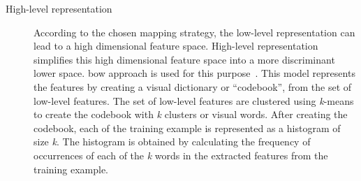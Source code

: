 \begin{description}
\item[High-level representation] According to the chosen mapping strategy, the low-level representation can lead to a high dimensional feature space. 
High-level representation simplifies this high dimensional feature space into a more discriminant lower space. 
\ac{bow} approach is used for this purpose~\cite{Sivic2003}.
This model represents the features by creating a visual dictionary or ``codebook'', from the set of low-level features.
The set of low-level features are clustered using \textit{k}-means to create the codebook with \textit{k} clusters or visual words.
After creating the codebook, each of the training example is represented as a histogram of size \textit{k}. 
The histogram is obtained by calculating the frequency of occurrences of each of the \textit{k} words in the extracted features from the training example. 

\end{description}




